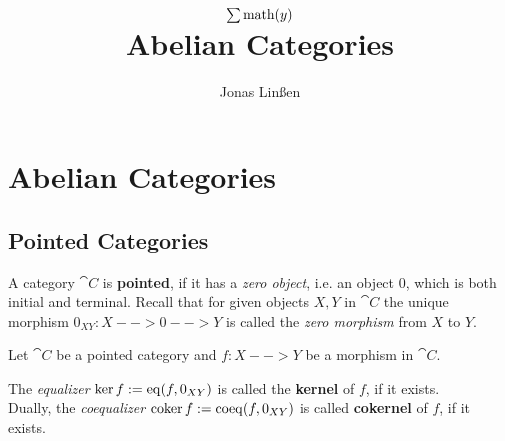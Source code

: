 

\title{
	$\sum \text{math}(y)$\\
	Abelian Categories
}
\author{Jonas Linßen}


	\maketitle
	\tableofcontents

	\newpage
	\section{Abelian Categories}
	\subsection{Pointed Categories}

	\begin{definition}
		A category $\cat{C}$ is \textbf{pointed}, if it has a \textit{zero object}, i.e. an object $0$, which is both initial and terminal. Recall that for given objects $X,Y$ in $\cat{C}$ the unique morphism $0_{XY}:X-->0-->Y$ is called the \textit{zero morphism} from $X$ to $Y$.
	\end{definition}

	\begin{definition}
		Let $\cat{C}$ be a pointed category and $f:X-->Y$ be a morphism in $\cat{C}$.

		The \textit{equalizer} $\ker f := \operatorname{eq} (f,0_{XY})$ is called the \textbf{kernel} of $f$, if it exists.\\
		Dually, the \textit{coequalizer} $\operatorname{coker} f := \operatorname{coeq}(f,0_{XY})$ is called \textbf{cokernel} of $f$, if it exists.
	\end{definition}

